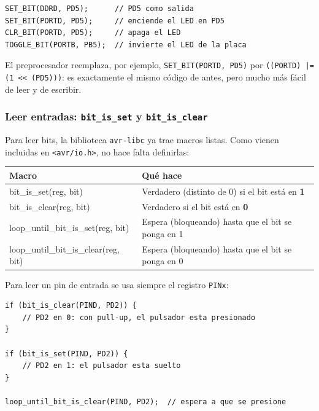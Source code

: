 \begin{lstlisting}[style=estilo-c]
SET_BIT(DDRD, PD5);      // PD5 como salida
SET_BIT(PORTD, PD5);     // enciende el LED en PD5
CLR_BIT(PORTD, PD5);     // apaga el LED
TOGGLE_BIT(PORTB, PB5);  // invierte el LED de la placa
\end{lstlisting}

El preprocesador reemplaza, por ejemplo, \texttt{SET\_BIT(PORTD, PD5)} por
\texttt{((PORTD) |= (1 <{}< (PD5)))}: es exactamente el mismo código de antes, pero mucho
más fácil de leer y de escribir.

\subsubsection{Leer entradas: \texttt{bit\_is\_set} y \texttt{bit\_is\_clear}}

Para leer bits, la biblioteca \texttt{avr-libc} ya trae macros listas. Como vienen
incluidas en \texttt{<avr/io.h>}, no hace falta definirlas:

\begin{table}[H]
\centering
\begin{tabularx}{\textwidth}{>{\ttfamily}l>{\raggedright\arraybackslash}X}
\toprule
\textbf{\sffamily Macro} & \textbf{Qué hace} \\
\midrule
bit\_is\_set(reg, bit)   & Verdadero (distinto de 0) si el bit está en \textbf{1} \\
bit\_is\_clear(reg, bit) & Verdadero si el bit está en \textbf{0} \\
loop\_until\_bit\_is\_set(reg, bit)   & Espera (bloqueando) hasta que el bit se ponga en 1 \\
loop\_until\_bit\_is\_clear(reg, bit) & Espera (bloqueando) hasta que el bit se ponga en 0 \\
\bottomrule
\end{tabularx}
\end{table}

Para leer un pin de entrada se usa siempre el registro \texttt{PINx}:

\begin{lstlisting}[style=estilo-c]
if (bit_is_clear(PIND, PD2)) {
    // PD2 en 0: con pull-up, el pulsador esta presionado
}

if (bit_is_set(PIND, PD2)) {
    // PD2 en 1: el pulsador esta suelto
}

loop_until_bit_is_clear(PIND, PD2);  // espera a que se presione
\end{lstlisting}

